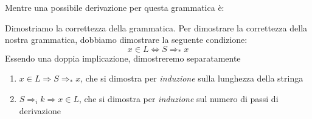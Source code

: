 \documentclass[a4paper,oneside]{scrbook}
\newcommand{\blue}[1]{\textcolor{blue}{#1}}
\begin{document}
Mentre una possibile derivazione per questa grammatica è:
\begin{center}
\end{center}
Dimostriamo la correttezza della grammatica.
Per dimostrare la correttezza della nostra grammatica, dobbiamo dimostrare la seguente condizione:
$$x\in L \Leftrightarrow S \Rightarrow_* x$$
Essendo una doppia implicazione, dimostreremo separatamente
\begin{enumerate}
	\item $x\in L \Rightarrow S \Rightarrow_* x $, che si dimostra per \textit{induzione} sulla lunghezza della stringa
	\item $ S \Rightarrow_i k \Rightarrow x \in L$, che si dimostra per \textit{induzione} sul numero di passi di derivazione
\end{enumerate}
\end{document}
